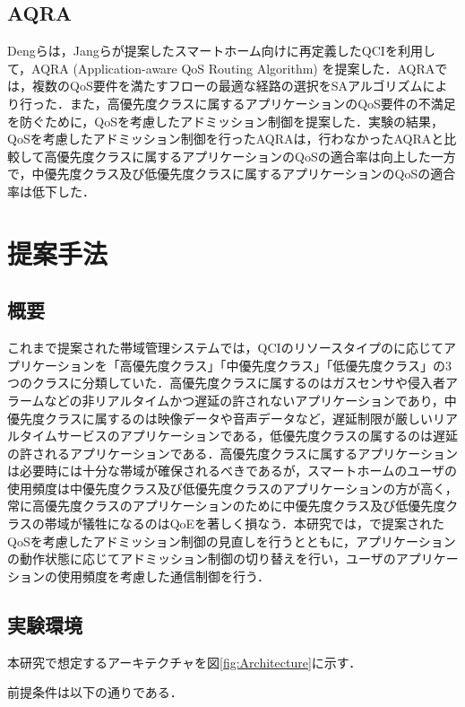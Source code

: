 \documentclass[a4paper,10pt,twocolumn,uplatex]{jsarticle}
\begin{document}
\subsection{AQRA}
Dengらは，Jangらが提案したスマートホーム向けに再定義したQCIを利用して，AQRA (Application-aware QoS Routing Algorithm) を提案した\cite{AQRA}．AQRAでは，複数のQoS要件を満たすフローの最適な経路の選択をSAアルゴリズムにより行った．また，高優先度クラスに属するアプリケーションのQoS要件の不満足を防ぐために，QoSを考慮したアドミッション制御を提案した．実験の結果，QoSを考慮したアドミッション制御を行ったAQRAは，行わなかったAQRAと比較して高優先度クラスに属するアプリケーションのQoSの適合率は向上した一方で，中優先度クラス及び低優先度クラスに属するアプリケーションのQoSの適合率は低下した．\par

\section{提案手法}

\subsection{概要}
これまで提案された帯域管理システムでは，QCIのリソースタイプのに応じてアプリケーションを「高優先度クラス」「中優先度クラス」「低優先度クラス」の3つのクラスに分類していた．高優先度クラスに属するのはガスセンサや侵入者アラームなどの非リアルタイムかつ遅延の許されないアプリケーションであり，中優先度クラスに属するのは映像データや音声データなど，遅延制限が厳しいリアルタイムサービスのアプリケーションである，低優先度クラスの属するのは遅延の許されるアプリケーションである．高優先度クラスに属するアプリケーションは必要時には十分な帯域が確保されるべきであるが，スマートホームのユーザの使用頻度は中優先度クラス及び低優先度クラスのアプリケーションの方が高く，常に高優先度クラスのアプリケーションのために中優先度クラス及び低優先度クラスの帯域が犠牲になるのはQoEを著しく損なう．本研究では，\cite{AQRA}で提案されたQoSを考慮したアドミッション制御の見直しを行うとともに，アプリケーションの動作状態に応じてアドミッション制御の切り替えを行い，ユーザのアプリケーションの使用頻度を考慮した通信制御を行う．

\subsection{実験環境}
本研究で想定するアーキテクチャを図\ref{fig:Architecture}に示す．\par
前提条件は以下の通りである．\par
\end{document}
